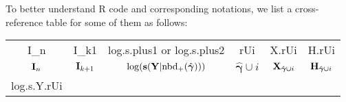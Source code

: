 \documentclass[
]{book}
\begin{document}
To better understand R code and corresponding notations, we list a cross-reference table for some of them as follows:

\begin{longtable}[]{@{}cccccc@{}}
\toprule
\endhead
\begin{minipage}[t]{0.14\columnwidth}\centering
I\_n\strut
\end{minipage} & \begin{minipage}[t]{0.14\columnwidth}\centering
I\_k1\strut
\end{minipage} & \begin{minipage}[t]{0.14\columnwidth}\centering
log.s.plus1 or log.s.plus2\strut
\end{minipage} & \begin{minipage}[t]{0.14\columnwidth}\centering
rUi\strut
\end{minipage} & \begin{minipage}[t]{0.14\columnwidth}\centering
X.rUi\strut
\end{minipage} & \begin{minipage}[t]{0.14\columnwidth}\centering
H.rUi\strut
\end{minipage}\tabularnewline
\begin{minipage}[t]{0.14\columnwidth}\centering
\({\bf I}_n\)\strut
\end{minipage} & \begin{minipage}[t]{0.14\columnwidth}\centering
\({\bf I}_{k+1}\)\strut
\end{minipage} & \begin{minipage}[t]{0.14\columnwidth}\centering
\(\log({\bf s}({\bf Y}|{\text{nbd}}_+(\hat{\boldsymbol \gamma})))\)\strut
\end{minipage} & \begin{minipage}[t]{0.14\columnwidth}\centering
\(\hat{\boldsymbol \gamma}\cup i\)\strut
\end{minipage} & \begin{minipage}[t]{0.14\columnwidth}\centering
\({\bf X}_{\hat{\boldsymbol \gamma}\cup i}\)\strut
\end{minipage} & \begin{minipage}[t]{0.14\columnwidth}\centering
\({\bf H}_{\hat{\boldsymbol \gamma}\cup i}\)\strut
\end{minipage}\tabularnewline
\begin{minipage}[t]{0.14\columnwidth}\centering
log.s.Y.rUi\strut
\end{minipage} & \begin{minipage}[t]{0.14\columnwidth}\centering

\end{minipage}
\end{longtable}
\end{document}

